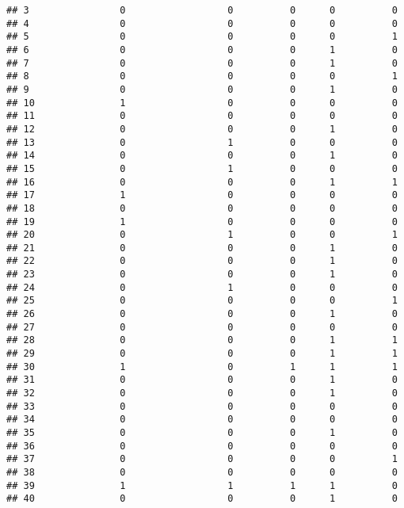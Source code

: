 \documentclass[
]{article}
\begin{document}
\begin{verbatim}
## 3                0                  0          0      0          0
## 4                0                  0          0      0          0
## 5                0                  0          0      0          1
## 6                0                  0          0      1          0
## 7                0                  0          0      1          0
## 8                0                  0          0      0          1
## 9                0                  0          0      1          0
## 10               1                  0          0      0          0
## 11               0                  0          0      0          0
## 12               0                  0          0      1          0
## 13               0                  1          0      0          0
## 14               0                  0          0      1          0
## 15               0                  1          0      0          0
## 16               0                  0          0      1          1
## 17               1                  0          0      0          0
## 18               0                  0          0      0          0
## 19               1                  0          0      0          0
## 20               0                  1          0      0          1
## 21               0                  0          0      1          0
## 22               0                  0          0      1          0
## 23               0                  0          0      1          0
## 24               0                  1          0      0          0
## 25               0                  0          0      0          1
## 26               0                  0          0      1          0
## 27               0                  0          0      0          0
## 28               0                  0          0      1          1
## 29               0                  0          0      1          1
## 30               1                  0          1      1          1
## 31               0                  0          0      1          0
## 32               0                  0          0      1          0
## 33               0                  0          0      0          0
## 34               0                  0          0      0          0
## 35               0                  0          0      1          0
## 36               0                  0          0      0          0
## 37               0                  0          0      0          1
## 38               0                  0          0      0          0
## 39               1                  1          1      1          0
## 40               0                  0          0      1          0

\end{verbatim}
\end{document}
